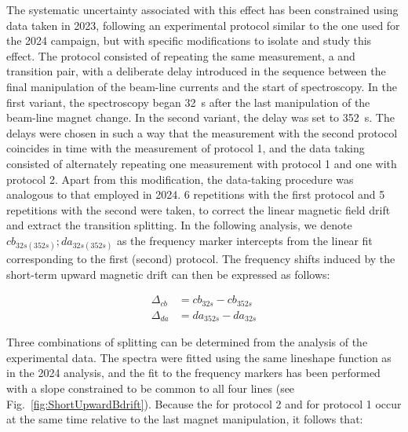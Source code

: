 The systematic uncertainty associated with this effect has been constrained using data taken in 2023, following an experimental protocol similar to the one used for the 2024 campaign, but with specific modifications to isolate and study this effect. The protocol consisted of repeating the same measurement, a \cb and \da transition pair, with a deliberate delay introduced in the sequence between the final manipulation of the beam-line currents and the start of spectroscopy. In the first variant, the spectroscopy began \SI{32}{\second} after the last manipulation of the beam-line magnet change. In the second variant, the delay was set to \SI{352}{\second}. The delays were chosen in such a way that the \cb measurement with the second protocol coincides in time with the \da measurement of protocol 1, and the data taking consisted of alternately repeating one measurement with protocol 1 and one with protocol 2. Apart from this modification, the data-taking procedure was analogous to that employed in 2024. 6 repetitions with the first protocol and 5 repetitions with the second were taken, to correct the linear magnetic field drift and extract the transition splitting. In the following analysis, we denote $cb_{32s (352s)} ; da_{32s (352s)} $ as the frequency marker intercepts from the linear fit corresponding to the first (second) protocol. The frequency shifts induced by the short-term upward magnetic drift can then be expressed as follows:

\begin{align*}
\Delta _{cb} &= cb_{32s}  - cb_{352s} \\
\Delta _{da} &= da_{352s} - da_{32s}
\end{align*}

Three combinations of splitting can be determined from the analysis of the experimental data. The spectra were fitted using the same lineshape function as in the 2024 analysis, and the fit to the frequency markers has been performed with a slope constrained to be common to all four lines (see Fig.~\ref{fig:ShortUpwardBdrift}). Because the \cb for protocol 2 and \da for protocol 1 occur at the same time relative to the last magnet manipulation, it follows that:



